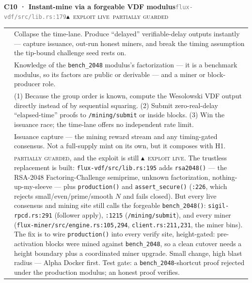 \documentclass[10pt,a4paper]{article}
\makeatletter
\newcommand{\stXL}{\textcolor{sigilred}{$\blacktriangle$}~{\scriptsize\textcolor{sigilred}{\textsc{exploit live}}}}
\newcommand{\svM}{{\scriptsize\textcolor{sigilamber}{\textsc{major}}}}
\newcommand{\mgPartial}{{\scriptsize\textcolor{sigilviolet}{\textsc{partially guarded}}}}
\newcommand{\frow}[2]{{\footnotesize\textcolor{gray}{\textsc{#1}}}\;&\small #2\\}
\newenvironment{atkentry}[5]{%
\begin{tcolorbox}[enhanced,breakable,colback=white,colframe=slate,boxrule=0.6pt,arc=2pt,
  left=8pt,right=8pt,top=6pt,bottom=6pt,
  borderline west={3pt}{0pt}{sigilred!60!slate}]
{\small\textbf{#1 · #2}\hfill{\footnotesize\textcolor{gray}{\texttt{#3}}}\quad#4\quad#5}\\[4pt]
\begin{tabular}{@{}>{\raggedleft\arraybackslash}p{2.1cm}p{12.9cm}@{}}
}{%
\end{tabular}
\end{tcolorbox}\vspace{2pt}}
\makeatother
\begin{document}
\begin{atkentry}{C10}{Instant-mine via a forgeable VDF modulus}{flux-vdf/src/lib.rs:179}{\svM}{\stXL~\mgPartial}
\frow{goal}{Collapse the time-lane. Produce ``delayed'' verifiable-delay outputs instantly
— capture issuance, out-run honest miners, and break the timing assumption the tip-bound
challenge seed rests on.}
\frow{preconditions}{Knowledge of the \texttt{bench\_2048} modulus's factorization — it is
a benchmark modulus, so its factors are public or derivable — and a miner or
block-producer role.}
\frow{steps}{(1) Because the group order is known, compute the Wesolowski VDF output
directly instead of by sequential squaring. (2) Submit zero-real-delay ``elapsed-time''
proofs to \texttt{/mining/submit} or inside blocks. (3) Win the issuance race; the
time-lane offers no independent rate limit.}
\frow{buys}{Issuance capture — the mining reward stream and any timing-gated consensus. Not
a full-supply mint on its own, but it composes with H1.}
\frow{defense}{\mgPartial{}, and the exploit is still \stXL{}. The trustless replacement is
built: \texttt{flux-vdf/src/lib.rs:195} adds \texttt{rsa2048()} — the RSA-2048
Factoring-Challenge semiprime, unknown factorization, nothing-up-my-sleeve — plus
\texttt{production()} and \texttt{assert\_secure()} (\texttt{:226}, which rejects
small/even/prime/smooth $N$ and fails closed). But every live consensus and mining site
still calls the forgeable \texttt{bench\_2048()}: \texttt{sigil-rpcd.rs:291} (follower
apply), \texttt{:1215} (\texttt{/mining/submit}), and every miner
(\texttt{flux-miner/src/engine.rs:105,294}, \texttt{client.rs:211,231}, the miner bins).
The fix is to wire \texttt{production()} into every verify site, height-gated: pre-activation
blocks were mined against \texttt{bench\_2048}, so a clean cutover needs a height boundary
plus a coordinated miner upgrade. Small change, high blast radius — Alpha Docker first.
Test gate: a \texttt{bench\_2048}-shortcut proof rejected under the production modulus; an
honest proof verifies.}
\end{atkentry}
\end{document}
